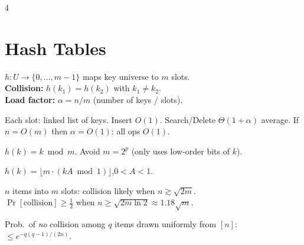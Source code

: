 \documentclass[8pt,a4paper,landscape]{extarticle}
\begin{document}
\begin{multicols*}{4}
\section{Hash Tables}

\begin{defn}[title=Hash function]
$h: U\to\{0,\ldots,m{-}1\}$ maps key universe to $m$ slots.\\
\textbf{Collision:} $h(k_1)=h(k_2)$ with $k_1\neq k_2$.\\
\textbf{Load factor:} $\alpha = n/m$ (number of keys / slots).
\end{defn}

\begin{prop}[title=Chaining (collision resolution)]
Each slot: linked list of keys. Insert $O(1)$. Search/Delete $\Theta(1{+}\alpha)$ average. If $n=O(m)$ then $\alpha=O(1)$: all ops $O(1)$.
\end{prop}

\begin{prop}[title=Division method]
$h(k) = k \bmod m$. Avoid $m=2^p$ (only uses low-order bits of $k$).
\end{prop}

\begin{prop}[title=Multiplication method]
$h(k) = \lfloor m\cdot(kA \bmod 1)\rfloor$,\quad $0 < A < 1$.
\end{prop}

\begin{prop}[title=Birthday paradox]
$n$ items into $m$ slots: collision likely when $n\gtrsim\sqrt{2m}$.\\
$\Pr[\text{collision}]\geq\tfrac{1}{2}$ when $n\geq\sqrt{2m\ln 2}\approx 1.18\sqrt{m}$.
\end{prop}

\begin{prop}[title=Birthday lemma]
Prob.\ of \emph{no} collision among $q$ items drawn uniformly from $[n]$:
$\leq e^{-q(q-1)/(2n)}$.
\end{prop}

\end{multicols*}
\end{document}
